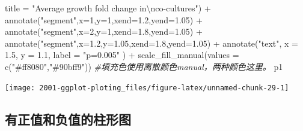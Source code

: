 \documentclass[
]{book}
\newenvironment{Shaded}{\begin{snugshade}}{\end{snugshade}}
\newcommand{\AttributeTok}[1]{\textcolor[rgb]{0.77,0.63,0.00}{#1}}
\newcommand{\CommentTok}[1]{\textcolor[rgb]{0.56,0.35,0.01}{\textit{#1}}}
\newcommand{\DecValTok}[1]{\textcolor[rgb]{0.00,0.00,0.81}{#1}}
\newcommand{\FloatTok}[1]{\textcolor[rgb]{0.00,0.00,0.81}{#1}}
\newcommand{\FunctionTok}[1]{\textcolor[rgb]{0.00,0.00,0.00}{#1}}
\newcommand{\NormalTok}[1]{#1}
\newcommand{\SpecialCharTok}[1]{\textcolor[rgb]{0.00,0.00,0.00}{#1}}
\newcommand{\StringTok}[1]{\textcolor[rgb]{0.31,0.60,0.02}{#1}}
\begin{document}
\begin{Shaded}
\begin{Highlighting}[]
       \AttributeTok{title =} \StringTok{"Average growth fold change in}\SpecialCharTok{\textbackslash{}n}\StringTok{co{-}cultures"}\NormalTok{) }\SpecialCharTok{+}
  \FunctionTok{annotate}\NormalTok{(}\StringTok{"segment"}\NormalTok{,}\AttributeTok{x=}\DecValTok{1}\NormalTok{,}\AttributeTok{y=}\DecValTok{1}\NormalTok{,}\AttributeTok{xend=}\FloatTok{1.2}\NormalTok{,}\AttributeTok{yend=}\FloatTok{1.05}\NormalTok{) }\SpecialCharTok{+}
  \FunctionTok{annotate}\NormalTok{(}\StringTok{"segment"}\NormalTok{,}\AttributeTok{x=}\DecValTok{2}\NormalTok{,}\AttributeTok{y=}\DecValTok{1}\NormalTok{,}\AttributeTok{xend=}\FloatTok{1.8}\NormalTok{,}\AttributeTok{yend=}\FloatTok{1.05}\NormalTok{) }\SpecialCharTok{+} 
  \FunctionTok{annotate}\NormalTok{(}\StringTok{"segment"}\NormalTok{,}\AttributeTok{x=}\FloatTok{1.2}\NormalTok{,}\AttributeTok{y=}\FloatTok{1.05}\NormalTok{,}\AttributeTok{xend=}\FloatTok{1.8}\NormalTok{,}\AttributeTok{yend=}\FloatTok{1.05}\NormalTok{) }\SpecialCharTok{+} 
  \FunctionTok{annotate}\NormalTok{(}\StringTok{"text"}\NormalTok{, }\AttributeTok{x =} \FloatTok{1.5}\NormalTok{, }\AttributeTok{y =} \FloatTok{1.1}\NormalTok{, }\AttributeTok{label =} \StringTok{"p=0.005"}\NormalTok{ ) }\SpecialCharTok{+} 
  \FunctionTok{scale\_fill\_manual}\NormalTok{(}\AttributeTok{values =} \FunctionTok{c}\NormalTok{(}\StringTok{"\#ff8080"}\NormalTok{,}\StringTok{"\#90bff9"}\NormalTok{)) }\CommentTok{\#填充色使用离散颜色manual，两种颜色这里。}
\NormalTok{p1}
\end{Highlighting}
\end{Shaded}

\begin{center}\texttt{[image: 2001-ggplot-ploting\_files/figure-latex/unnamed-chunk-29-1]} \end{center}

\hypertarget{ux6709ux6b63ux503cux548cux8d1fux503cux7684ux67f1ux5f62ux56fe}{%
\subsection{有正值和负值的柱形图}\label{ux6709ux6b63ux503cux548cux8d1fux503cux7684ux67f1ux5f62ux56fe}}
\end{document}
